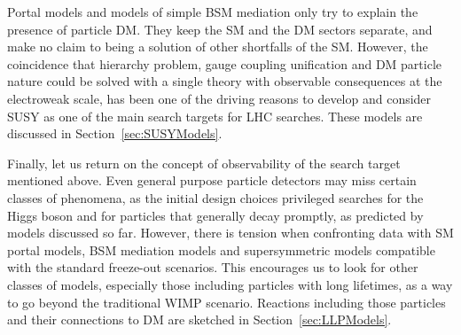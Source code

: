 \begin{textbox}[!h]
\begin{marginnote}[]
\end{marginnote}





Portal models and models of simple BSM mediation only try to explain the presence of particle DM. They keep the SM and the DM sectors separate, and make no claim to being a solution of other shortfalls of the SM. However, the coincidence that hierarchy problem, gauge coupling unification and DM particle nature could be solved with a single theory with observable consequences at the electroweak scale, has been one of the driving reasons to develop and consider SUSY as one of the main search targets for LHC searches. These models are discussed in Section~\ref{sec:SUSYModels}.

Finally, let us return on the concept of observability of the search target mentioned above. Even general purpose particle detectors may miss certain classes of phenomena, as the initial design choices privileged searches for the Higgs boson and for particles that generally decay promptly, as predicted by models discussed so far. However, there is tension when confronting data with SM portal models, BSM mediation models and supersymmetric models compatible with the standard freeze-out scenarios. This encourages us to look for other classes of models, especially those including particles with long lifetimes, as a way to go beyond the traditional WIMP scenario. Reactions including those particles and their connections to DM are sketched in Section~\ref{sec:LLPModels}.


\end{textbox}
